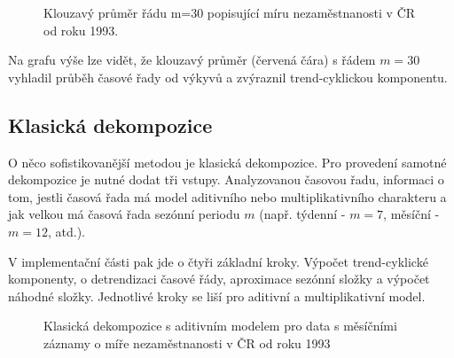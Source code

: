 \documentclass[FM,BP,fonts]{tulthesis}
\begin{document}
\begin{figure}[htbp]
	\centering
	\caption{Klouzavý průměr řádu m=30 popisující míru nezaměstnanosti v ČR od roku 1993. }
	\label{fig:my_graph}
\end{figure}

Na grafu výše lze vidět, že klouzavý průměr (červená čára) s řádem $m=30$ vyhladil průběh časové řady od výkyvů a zvýraznil trend-cyklickou komponentu.

\subsection{Klasická dekompozice}
O něco sofistikovanější metodou je klasická dekompozice. Pro provedení samotné dekompozice je nutné dodat tři vstupy. Analyzovanou časovou řadu, informaci o tom, jestli časová řada má model aditivního nebo multiplikativního charakteru a jak velkou má časová řada sezónní periodu $m$ (např. týdenní - $m=7$, měsíční - $m=12$, atd.). 

V implementační části pak jde o čtyři základní kroky. Výpočet trend-cyklické komponenty, o detrendizaci časové řády, aproximace sezónní složky a výpočet náhodné složky. \cite{Hyndman2013-wm} Jednotlivé kroky se liší pro aditivní a multiplikativní model. 
 
\begin{figure}[htbp]
	\centering
	\caption{Klasická dekompozice s aditivním modelem pro data s měsíčními záznamy o míře nezaměstnanosti v ČR od roku 1993 }
	\label{fig:my_graph}
\end{figure}
\end{document}
